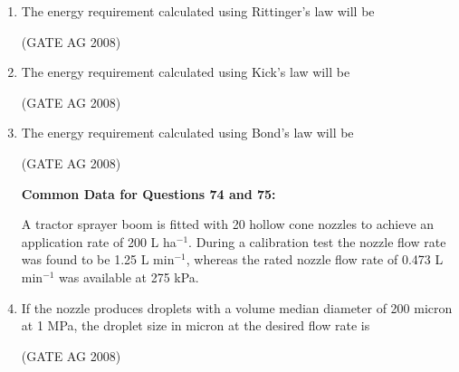 \documentclass[journal,12pt,onecolumn]{IEEEtran}
\begin{document}
\begin{enumerate}
\item 
 The energy requirement calculated using Rittinger's law will be
\begin{enumerate}
\end{enumerate}
\hfill(GATE AG 2008)\\

\medskip

\item 
 The energy requirement calculated using Kick's law will be
\begin{enumerate}
\end{enumerate}
\hfill(GATE AG 2008)\\

\medskip

\item 
 The energy requirement calculated using Bond's law will be
\begin{enumerate}
\end{enumerate}
\hfill(GATE AG 2008)\\

\medskip


\textbf{Common Data for Questions 74 and 75:}

A tractor sprayer boom is fitted with 20 hollow cone nozzles to achieve an application rate of 200 L ha$^{-1}$. During a calibration test the nozzle flow rate was found to be 1.25 L min$^{-1}$, whereas the rated nozzle flow rate of 0.473 L min$^{-1}$ was available at 275 kPa.

\item 
 If the nozzle produces droplets with a volume median diameter of 200 micron at 1 MPa, the droplet size in micron at the desired flow rate is
\begin{enumerate}
\end{enumerate}
\hfill(GATE AG 2008)\\


\end{enumerate}
\end{document}
